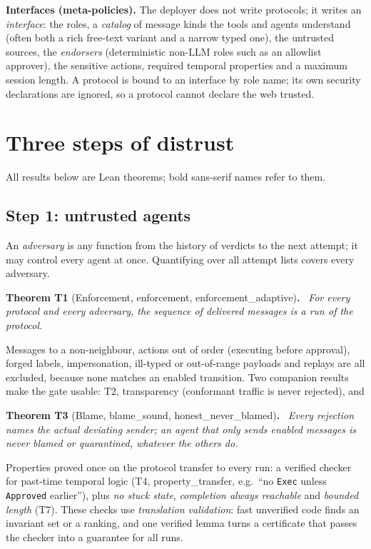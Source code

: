 \documentclass[10pt,twocolumn]{article}
\newenvironment{theorem}[2]{\par\smallskip\noindent\textbf{Theorem #1} (#2)\textbf{.}\ \itshape}{\par\smallskip}
\newcommand{\code}[1]{\texttt{\small #1}}
\newcommand{\thm}[1]{\textcolor{dk}{\textsf{\small #1}}}
\begin{document}
\textbf{Interfaces (meta-policies).} The deployer does not write protocols; it writes an \emph{interface}: the
roles, a \emph{catalog} of message kinds the tools and agents understand (often both a rich free-text variant
and a narrow typed one), the untrusted sources, the \emph{endorsers} (deterministic non-LLM roles such as an
allowlist approver), the sensitive actions, required temporal properties and a maximum session length. A
protocol is bound to an interface by role name; its own security declarations are ignored, so a protocol cannot
declare the web trusted.

\section{Three steps of distrust}

All results below are Lean theorems; bold sans-serif names refer to them.

\subsection{Step 1: untrusted agents}

An \emph{adversary} is any function from the history of verdicts to the next attempt; it may control every agent
at once. Quantifying over all attempt lists covers every adversary.

\begin{theorem}{T1}{Enforcement, \thm{enforcement}, \thm{enforcement\_adaptive}}
For every protocol and every adversary, the sequence of delivered messages is a run of the protocol.
\end{theorem}

\noindent Messages to a non-neighbour, actions out of order (executing before approval), forged labels,
impersonation, ill-typed or out-of-range payloads and replays are all excluded, because none matches an enabled
transition. Two companion results make the gate usable: T2, \thm{transparency} (conformant traffic is never
rejected), and

\begin{theorem}{T3}{Blame, \thm{blame\_sound}, \thm{honest\_never\_blamed}}
Every rejection names the actual deviating sender; an agent that only sends enabled messages is never blamed or
quarantined, whatever the others do.
\end{theorem}

\noindent Properties proved once on the protocol transfer to every run: a verified checker for past-time
temporal logic (T4, \thm{property\_transfer}, e.g.\ ``no \code{Exec} unless \code{Approved} earlier''), plus
\emph{no stuck state}, \emph{completion always reachable} and \emph{bounded length} (T7). These checks use
\emph{translation validation}: fast unverified code finds an invariant set or a ranking, and one verified lemma
turns a certificate that passes the checker into a guarantee for all runs.
\end{document}
